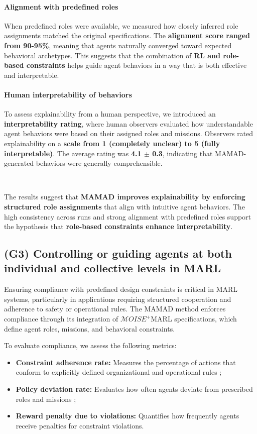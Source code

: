 \documentclass[pdflatex,sn-mathphys-num]{sn-jnl}%
\theoremstyle{thmstyleone}%
\theoremstyle{thmstyletwo}%
\theoremstyle{thmstylethree}%
\begin{document}
\paragraph{Alignment with predefined roles}
When predefined roles were available, we measured how closely inferred role assignments matched the original specifications. The \textbf{alignment score ranged from 90-95\%}, meaning that agents naturally converged toward expected behavioral archetypes. This suggests that the combination of \textbf{RL and role-based constraints} helps guide agent behaviors in a way that is both effective and interpretable.

\paragraph{Human interpretability of behaviors}
To assess explainability from a human perspective, we introduced an \textbf{interpretability rating}, where human observers evaluated how understandable agent behaviors were based on their assigned roles and missions. Observers rated explainability on a \textbf{scale from 1 (completely unclear) to 5 (fully interpretable)}. The average rating was \textbf{4.1 $\pm$ 0.3}, indicating that MAMAD-generated behaviors were generally comprehensible.

\

The results suggest that \textbf{MAMAD improves explainability by enforcing structured role assignments} that align with intuitive agent behaviors. The high consistency across runs and strong alignment with predefined roles support the hypothesis that \textbf{role-based constraints enhance interpretability}.


\subsection{(G3) Controlling or guiding agents at both individual and collective levels in MARL}

Ensuring compliance with predefined design constraints is critical in MARL systems, particularly in applications requiring structured cooperation and adherence to safety or operational rules. The MAMAD method enforces compliance through its integration of $\mathcal{M}OISE^+$MARL specifications, which define agent roles, missions, and behavioral constraints. 

To evaluate compliance, we assess the following metrics:

\begin{itemize}
    \item \textbf{Constraint adherence rate:} Measures the percentage of actions that conform to explicitly defined organizational and operational rules ;
    \item \textbf{Policy deviation rate:} Evaluates how often agents deviate from prescribed roles and missions ;
    \item \textbf{Reward penalty due to violations:} Quantifies how frequently agents receive penalties for constraint violations.
\end{itemize}
\end{document}
